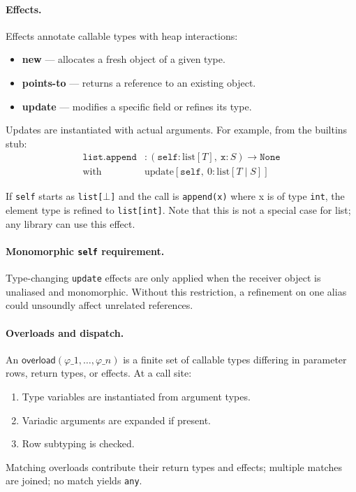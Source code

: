 \paragraph{Effects.}
Effects annotate callable types with heap interactions:
\begin{itemize}
\item \textbf{new} — allocates a fresh object of a given type.
\item \textbf{points-to} — returns a reference to an existing object.
\item \textbf{update} — modifies a specific field or refines its type.
\end{itemize}
Updates are instantiated with actual arguments. For example, from the builtins stub:
\begin{align*}
\texttt{list.append} &: (\texttt{self}:\mathrm{list}[T],\ \texttt{x}:S) \to \texttt{None} \\
\mathrm{with}\ & \mathrm{update}[\texttt{self},\ 0:\mathrm{list}[T \mid S]]
\end{align*}

If \texttt{self} starts as \texttt{list[$\bot$]} and the call is \texttt{append(x)} where x is of type \texttt{int}, the element type is refined to \texttt{list[int]}. Note that this is not a special case for list; any library can use this effect.

\paragraph{Monomorphic \texttt{self} requirement.}
Type-changing \texttt{update} effects are only applied when the receiver object is unaliased and monomorphic.
Without this restriction, a refinement on one alias could unsoundly affect unrelated references.

\paragraph{Overloads and dispatch.}
An $\mathsf{overload}(\varphi\_1,\dots,\varphi\_n)$ is a finite set of callable types differing in parameter rows, return types, or effects.
At a call site:
\begin{enumerate}
\item Type variables are instantiated from argument types.
\item Variadic arguments are expanded if present.
\item Row subtyping is checked.
\end{enumerate}
Matching overloads contribute their return types and effects; multiple matches are joined; no match yields \texttt{any}.

